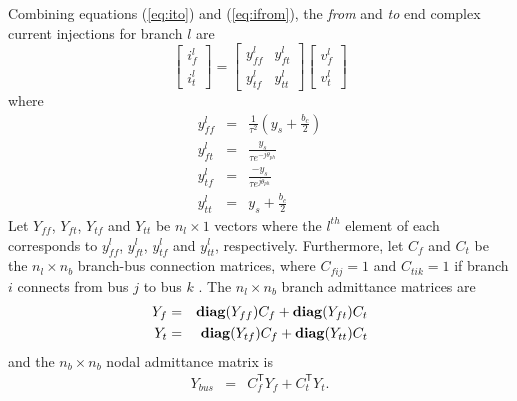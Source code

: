 
Combining equations (\ref{eq:ito}) and (\ref{eq:ifrom}), the \textit{from} and
\textit{to} end complex current injections for branch $l$ are
\begin{equation}
\label{eq:ybranch}
\begin{bmatrix}
i_f^l\\
i_t^l
\end{bmatrix}
=
\begin{bmatrix}
y_{ff}^l& y_{ft}^l\\
y_{tf}^l& y_{tt}^l
\end{bmatrix}
\begin{bmatrix}
v_f^l\\
v_t^l
\end{bmatrix}
\end{equation}
where
\begin{eqnarray}
\label{eq:yff}
y_{ff}^l& =& \frac{1}{\tau^2} \left(y_s + \frac{b_c}{2}\right)\\
\label{eq:yft}
y_{ft}^l& =& \frac{y_s}{\tau e^{-j\theta_{ph}}}\\
\label{eq:ytf}
y_{tf}^l& =& \frac{-y_s}{\tau e^{j\theta_{ph}}}\\
\label{eq:ytt}
y_{tt}^l& =& y_s + \frac{b_c}{2}
\end{eqnarray}
Let $Y_{ff}$, $Y_{ft}$, $Y_{tf}$ and $Y_{tt}$ be $n_l \times 1$ vectors where
the $l^{th}$ element of each corresponds to $y_{ff}^l$, $y_{ft}^l$,
$y_{tf}^l$ and $y_{tt}^l$, respectively.  Furthermore, let $C_f$ and $C_t$ be the
$n_l \times n_b$ branch-bus connection matrices, where $C_{fij} = 1$ and
$C_{tik} = 1$ if branch $i$ connects from bus $j$ to bus $k$
\cite[p.12]{pserc:mp_manual}.  The $n_l \times n_b$ branch admittance matrices
are
\begin{eqnarray}
Y_f& =& \mathop{\mathbf{diag}}(Y_{ff})C_f + \mathop{\mathbf{diag}}(Y_{ft})C_t\\
Y_t& =& \mathop{\mathbf{diag}}(Y_{tf})C_f + \mathop{\mathbf{diag}}(Y_{tt})C_t
\end{eqnarray}
and the
$n_b \times n_b$ nodal admittance matrix is
\begin{eqnarray}
Y_{bus}& =& C_f^\mathsf{T} Y_f + C_t^\mathsf{T} Y_t .
\end{eqnarray}
